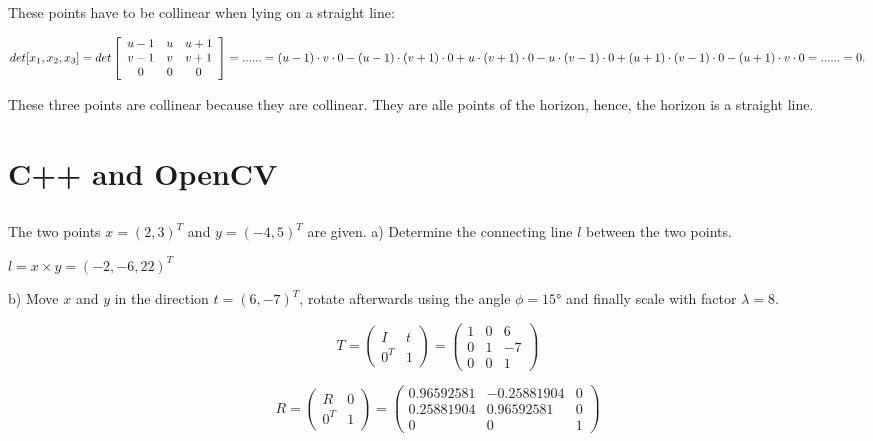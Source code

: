 \documentclass[a4paper,headings=small]{scrartcl}
\numberwithin{equation}{section} %
\numberwithin{figure}{section}   %
\begin{document}
These points have to be collinear when lying on a straight line:

$det[x_{1},x_{2},x_{3}]=
det\left[ \begin{array}{ccc}
u-1 & u & u+1\\
v-1 & v & v+1\\
0 & 0 & 0\end{array} \right]=...\newline
...=(u-1) \cdot v \cdot0 - (u-1) \cdot (v+1) \cdot 0 + u \cdot (v+1) \cdot 0 - u \cdot (v-1) \cdot 0
+(u+1) \cdot (v-1) \cdot 0 - (u+1) \cdot v \cdot 0=... \newline
...=0.$ \newline

These three points are collinear because they are collinear. They are alle points of the horizon, 
hence, the horizon is a straight line.

\newpage
\section{C++ and OpenCV}


\subsection{}

The two points $x = (2, 3)^T$ and $y = (-4, 5)^T$ are given. \newline
a) Determine the connecting line $l$ between the two points. \newline

      $l=x \times y=(-2,-6, 22)^T$

b) Move $x$ and $y$ in the direction $t = (6, -7)^T$,
rotate afterwards using the angle $\phi = 15°$ and finally
scale with factor $\lambda = 8$. \newline

\[T= 
\left( \begin{array}{cc}
I & t  \\
0^T & 1   \end{array} \right)
=
\left( \begin{array}{ccc}
1 & 0 &  6 \\
0 & 1 & -7 \\
0 & 0 &  1  \end{array} \right)\] 

\[R= 
\left( \begin{array}{cc}
R & 0  \\
0^T & 1   \end{array} \right)
=
\left( \begin{array}{ccc}
  0.96592581 & -0.25881904 & 0 \\
  0.25881904 &  0.96592581 & 0 \\
  0          &  0          & 1  \end{array} \right)\] 
\end{document}
